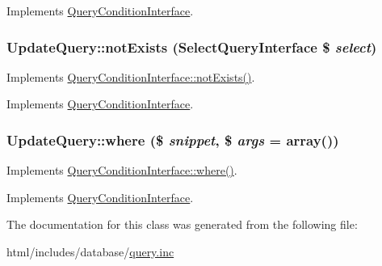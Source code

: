 Implements \hyperlink{interfaceQueryConditionInterface_a2978b536a3fe62b21e940366c9cb5923}{QueryConditionInterface}.\hypertarget{classUpdateQuery_a0fdac99cf74b86a774f31848d4f98206}{
\subsubsection[{notExists}]{\setlength{\rightskip}{0pt plus 5cm}UpdateQuery::notExists ({\bf SelectQueryInterface} \$ {\em select})}}
\label{classUpdateQuery_a0fdac99cf74b86a774f31848d4f98206}
Implements \hyperlink{interfaceQueryConditionInterface_a8aae11796846850edbf8caa3a9d4afcd}{QueryConditionInterface::notExists()}. 

Implements \hyperlink{interfaceQueryConditionInterface_a8aae11796846850edbf8caa3a9d4afcd}{QueryConditionInterface}.\hypertarget{classUpdateQuery_a67603f742b3130dd34fd786b69de7ec1}{
\subsubsection[{where}]{\setlength{\rightskip}{0pt plus 5cm}UpdateQuery::where (\$ {\em snippet}, \/  \$ {\em args} = {\ttfamily array()})}}
\label{classUpdateQuery_a67603f742b3130dd34fd786b69de7ec1}
Implements \hyperlink{interfaceQueryConditionInterface_a42c03c74dd81ef6d77041e67ec12e735}{QueryConditionInterface::where()}. 

Implements \hyperlink{interfaceQueryConditionInterface_a42c03c74dd81ef6d77041e67ec12e735}{QueryConditionInterface}.

The documentation for this class was generated from the following file:\begin{DoxyCompactItemize}
\item 
html/includes/database/\hyperlink{query_8inc}{query.inc}\end{DoxyCompactItemize}
